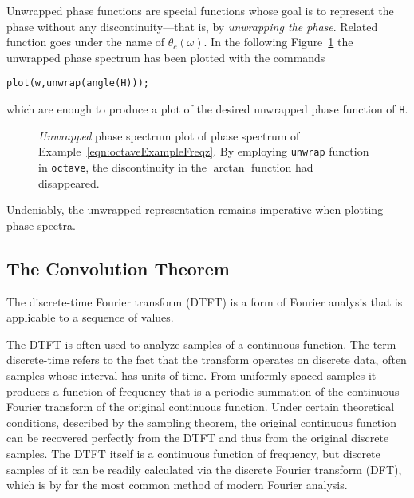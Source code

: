 \documentclass[\documentfontsize, twocolumn]{\classname}
\begin{document}
Unwrapped phase functions are special functions whose goal is to represent the phase without any dis\-con\-ti\-nui\-ty---that is, by \emph{unwrapping the phase}. Related function goes under the name of $\theta_c(\omega)$. In the following Figure~\ref{oct:octaveExampleFreqzUnwrap} the unwrapped phase spectrum has been plotted with the commands
\begin{verbatim}
plot(w,unwrap(angle(H)));
\end{verbatim}
which are enough to produce a plot of the desired unwrapped phase function of \texttt{H}.

\begin{figure}[ht]
    \begin{center}
\scalebox{0.6}{

}\caption{\emph{Unwrapped} phase spectrum plot of phase spectrum of Example~\ref{eqn:octaveExampleFreqz}. By employing \texttt{unwrap} function in \texttt{octave}, the discontinuity in the $\arctan{}$ function had disappeared.}\label{oct:octaveExampleFreqzUnwrap}
    \end{center}
\end{figure}
Undeniably, the unwrapped representation remains imperative when plotting phase spectra.

\subsection{The Convolution Theorem}

The discrete-time Fourier transform (DTFT) is a form of Fourier analysis that is applicable to a sequence of values.

The DTFT is often used to analyze samples of a continuous function. The term discrete-time refers to the fact that the transform operates on discrete data, often samples whose interval has units of time. From uniformly spaced samples it produces a function of frequency that is a periodic summation of the continuous Fourier transform of the original continuous function. Under certain theoretical conditions, described by the sampling theorem, the original continuous function can be recovered perfectly from the DTFT and thus from the original discrete samples. The DTFT itself is a continuous function of frequency, but discrete samples of it can be readily calculated via the discrete Fourier transform (DFT), which is by far the most common method of modern Fourier analysis.
\end{document}

